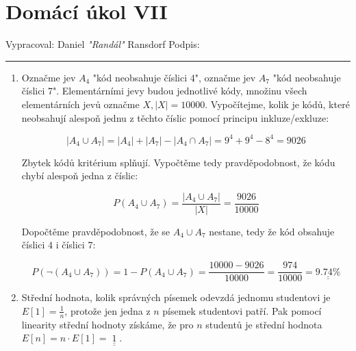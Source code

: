 \documentclass[12pt]{article}
\begin{document}
\section*{Domácí úkol VII}

Vypracoval: Daniel \textit{"Randál"} Ransdorf \hfill Podpis: \rule{4cm}{0.4pt}

\begin{enumerate}
  \item Označme jev $A_4$ "kód neobsahuje číslici 4", označme jev $A_7$
    "kód neobsahuje číslici 7". Elementárními jevy budou jednotlivé kódy,
    množinu všech elementárních jevů označme $X, |X|=10000$.
    Vypočítejme, kolik je kódů, které neobsahují
    alespoň jednu z těchto číslic pomocí principu inkluze/exkluze:

    \[
      |A_4\cup A_7| = |A_4| + |A_7| - |A_4\cap A_7|
        = 9^4 + 9^4 - 8^4 = 9026
    \]

    Zbytek kódů kritérium splňují. Vypočtěme tedy
    pravděpodobnost, že kódu chybí alespoň jedna z číslic:

    \[
      P(A_4\cup A_7) = \frac{|A_4\cup A_7|}{|X|} = \frac{9026}{10000}
    \]

    Dopočtěme pravděpodobnost, že se $A_4\cup A_7$ nestane, tedy že kód
    obsahuje číslici $4$ i číslici $7$:

    \[
      P(\neg (A_4\cup A_7)) = 1-P(A_4\cup A_7) = \frac{10000-9026}{10000}
      = \frac{974}{10000} = \underline{\underline{9.74\%}}
    \]

  \item Střední hodnota, kolik správných písemek odevzdá jednomu studentovi
    je $E[1] = \frac{1}{n}$, protože jen jedna z $n$ písemek studentovi patří.
    Pak pomocí linearity střední hodnoty získáme,
    že pro $n$ studentů je střední hodnota $E[n] = n\cdot E[1] = \underline{\underline{\;1\;}}$.

\end{enumerate}
\end{document}
